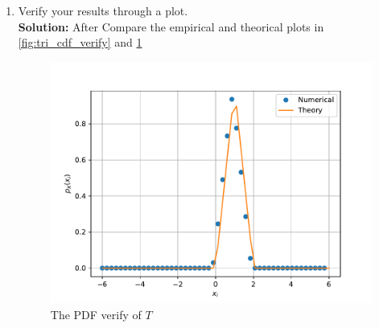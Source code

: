 \documentclass[journal,12pt,twocolumn]{IEEEtran}
\renewcommand\thesection{\arabic{section}}
\begin{document}
\begin{enumerate}[label=\thesection.\arabic*
,ref=\thesection.\theenumi]
\begin{align}
\end{align}
\begin{equation}
F_T\brak{t} =\begin{cases}
0 & t \le 0 \\
\int_{0}^{t}x.dx & 0 \le t <1 \\
\int_{1}^{t}2-x.dx + \frac{1}{2}& 1\le t \le2 \\
1 & 2 \le t
\end{cases}
\end{equation}
\begin{equation}
=\begin{cases}
0 & t \le 0 \\
\frac{x^2}{2} & 0 \le t <1 \\
\frac{\brak{2-x}^2}{2} & 1\le t \le2 \\
1 & 2 \le t
\end{cases}
\end{equation}
\item Verify your results through a plot. \\
\textbf{Solution:}
After Compare the empirical and theorical plots in \ref{fig:tri_cdf_verify} and \ref{fig:tri_pdf_verify}
\begin{figure}
\centering
\includegraphics[width=\columnwidth]{./figs/tri_pdf_verify}
\caption{The PDF verify of $T$}
\label{fig:tri_pdf_verify}
\end{figure}
\begin{figure}
\centering

\end{figure}
\end{enumerate}
\end{document}
